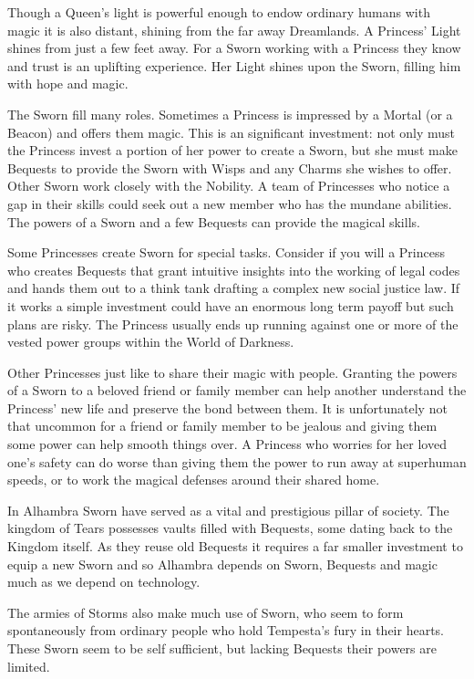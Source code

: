 Though a Queen's light is powerful enough to endow ordinary humans with magic it is also distant, shining from the far away Dreamlands. A Princess' Light shines from just a few feet away. For a Sworn working with a Princess they know and trust is an uplifting experience. Her Light shines upon the Sworn, filling him with hope and magic.

The Sworn fill many roles. Sometimes a Princess is impressed by a Mortal (or a Beacon) and offers them magic. This is an significant investment: not only must the Princess invest a portion of her power to create a Sworn, but she must make Bequests to provide the Sworn with Wisps and any Charms she wishes to offer. Other Sworn work closely with the Nobility. A team of Princesses who notice a gap in their skills could seek out a new member who has the mundane abilities. The powers of a Sworn and a few Bequests can provide the magical skills.

Some Princesses create Sworn for special tasks. Consider if you will a Princess who creates Bequests that grant intuitive insights into the working of legal codes and hands them out to a think tank drafting a complex new social justice law. If it works a simple investment could have an enormous long term payoff but such plans are risky. The Princess usually ends up running against one or more of the vested power groups within the World of Darkness.

Other Princesses just like to share their magic with people. Granting the powers of a Sworn to a beloved friend or family member can help another understand the Princess’ new life and preserve the bond between them. It is unfortunately not that uncommon for a friend or family member to be jealous and giving them some power can help smooth things over. A Princess who worries for her loved one’s safety can do worse than giving them the power to run away at superhuman speeds, or to work the magical defenses around their shared home.

In Alhambra Sworn have served as a vital and prestigious pillar of society. The kingdom of Tears possesses vaults filled with Bequests, some dating back to the Kingdom itself. As they reuse old Bequests it requires a far smaller investment to equip a new Sworn and so Alhambra depends on Sworn, Bequests and magic much as we depend on technology.

The armies of Storms also make much use of Sworn, who seem to form spontaneously from ordinary people who hold Tempesta’s fury in their hearts. These Sworn seem to be self sufficient, but lacking Bequests their powers are limited.

